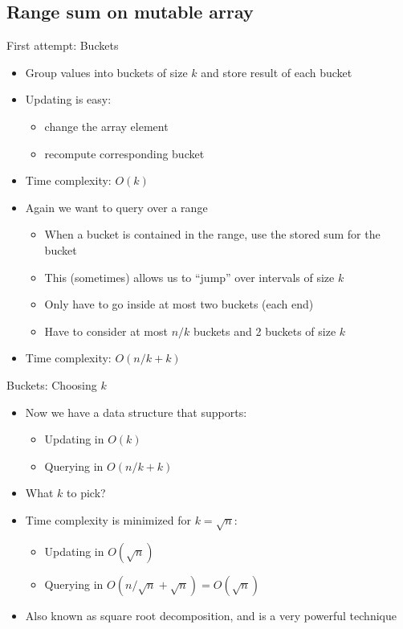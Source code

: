 \documentclass{beamer}
\begin{document}
\subsection*{Range sum on mutable array}

\begin{frame}[plain]{First attempt: Buckets}
    \begin{itemize}
        \item<1-> Group values into buckets of size $k$ and store result of each bucket
        \item<2-> Updating is easy:
        \begin{itemize}
            \item<3-> change the array element
            \item<4-> recompute corresponding bucket
        \end{itemize}
        \item<5-> Time complexity: $O(k)$
        \item<6-> Again we want to query over a range
        \begin{itemize}
            \item<7-> When a bucket is contained in the range, use the stored sum for the bucket
            \item<8-> This (sometimes) allows us to ``jump'' over intervals of size $k$
            \item<9-> Only have to go inside at most two buckets (each end)
            \item<10-> Have to consider at most $n/k$ buckets and 2 buckets of size $k$
        \end{itemize}
        \item<11-> Time complexity: $O(n/k + k)$
    \end{itemize}
\end{frame}

\begin{frame}[plain]{Buckets: Choosing $k$}
    \begin{itemize}
        \item<1-> Now we have a data structure that supports:
            \begin{itemize}
                \item<2-> Updating in $O(k)$
                \item Querying in $O(n/k + k)$
            \end{itemize}
        \item<3-> What $k$ to pick?
        \item<4-> Time complexity is minimized for $k=\sqrt{n}$:
            \begin{itemize}
                \item<5-> Updating in $O(\sqrt{n})$
                \item<6-> Querying in $O(n/\sqrt{n} + \sqrt{n}) = O(\sqrt{n})$
            \end{itemize}
        \item<7-> Also known as square root decomposition, and is a very
            powerful technique
    \end{itemize}
\end{frame}
\end{document}
